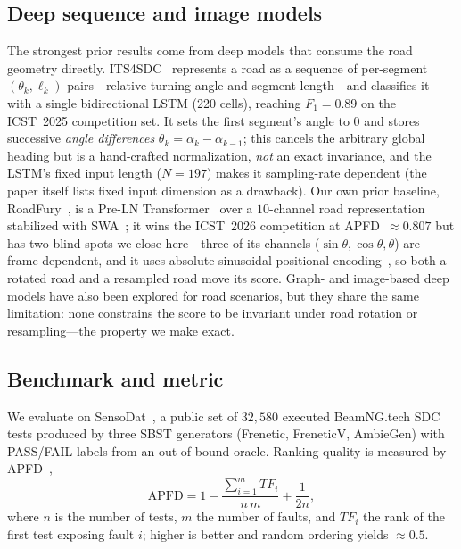 \subsection{Deep sequence and image models}

The strongest prior results come from deep models that consume the road
geometry directly. ITS4SDC~\cite{its4sdc} represents a road as a sequence of
per-segment $(\theta_k,\ell_k)$ pairs---relative turning angle and segment
length---and classifies it with a single bidirectional LSTM (220 cells),
reaching $F_1=0.89$ on the ICST~2025 competition set. It sets the first
segment's angle to $0$ and stores successive \emph{angle differences}
$\theta_k=\alpha_k-\alpha_{k-1}$; this cancels the arbitrary global heading but
is a hand-crafted normalization, \emph{not} an exact invariance, and the LSTM's
fixed input length ($N{=}197$) makes it sampling-rate dependent (the paper
itself lists fixed input dimension as a drawback). Our own prior baseline,
RoadFury~\cite{roadfury}, is a Pre-LN Transformer~\cite{transformer,preln}
over a $10$-channel road representation stabilized with SWA~\cite{swa}; it wins
the ICST~2026 competition at APFD~$\approx 0.807$ but has two blind spots we
close here---three of its channels ($\sin\theta,\cos\theta,\theta$) are
frame-dependent, and it uses absolute sinusoidal positional
encoding~\cite{transformer}, so both a rotated road and a resampled road move
its score. Graph- and image-based deep models have also been explored for road
scenarios, but they share the same limitation: none constrains the score to be
invariant under road rotation or resampling---the property we make exact.

\subsection{Benchmark and metric}

We evaluate on SensoDat~\cite{sensodat}, a public set of $32{,}580$ executed
BeamNG.tech SDC tests produced by three SBST generators (Frenetic, FreneticV,
AmbieGen) with PASS/FAIL labels from an out-of-bound oracle. Ranking quality is
measured by APFD~\cite{apfd,yooharman},
\begin{equation}
\mathrm{APFD}=1-\frac{\sum_{i=1}^{m}TF_i}{n\,m}+\frac{1}{2n},
\label{eq:apfd}
\end{equation}
where $n$ is the number of tests, $m$ the number of faults, and $TF_i$ the rank
of the first test exposing fault $i$; higher is better and random ordering
yields $\approx 0.5$.

